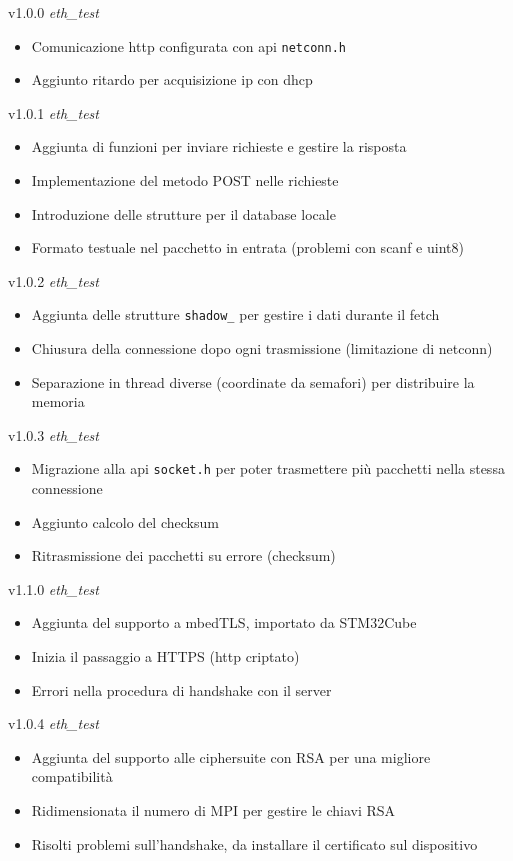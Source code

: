 v1.0.0 \textit{eth\_test}
	\begin{itemize}
	\item Comunicazione http configurata con api \texttt{netconn.h}
	\item Aggiunto ritardo per acquisizione ip con dhcp
	\end{itemize}
v1.0.1 \textit{eth\_test}
	\begin{itemize}
	\item Aggiunta di funzioni per inviare richieste e gestire la risposta
	\item Implementazione del metodo POST nelle richieste
	\item Introduzione delle strutture per il database locale
	\item Formato testuale nel pacchetto in entrata (problemi con scanf e uint8)
	\end{itemize}
v1.0.2 \textit{eth\_test}
	\begin{itemize}
	\item Aggiunta delle strutture \texttt{shadow\_} per gestire i dati durante il fetch
	\item Chiusura della connessione dopo ogni trasmissione (limitazione di netconn)
	\item Separazione in thread diverse (coordinate da semafori) per distribuire la memoria
	\end{itemize}
v1.0.3 \textit{eth\_test}
	\begin{itemize}
	\item Migrazione alla api \texttt{socket.h} per poter trasmettere pi\`{u} pacchetti nella stessa connessione
	\item Aggiunto calcolo del checksum 
	\item Ritrasmissione dei pacchetti su errore (checksum)
	\end{itemize}
v1.1.0 \textit{eth\_test}
	\begin{itemize}
	\item Aggiunta del supporto a mbedTLS, importato da STM32Cube
	\item Inizia il passaggio a HTTPS (http criptato)
	\item Errori nella procedura di handshake con il server
	\end{itemize}
v1.0.4 \textit{eth\_test}
	\begin{itemize}
	\item Aggiunta del supporto alle ciphersuite con RSA per una migliore compatibilit\`{a}
	\item Ridimensionata il numero di MPI per gestire le chiavi RSA
	\item Risolti problemi sull'handshake, da installare il certificato sul dispositivo
	\end{itemize}
